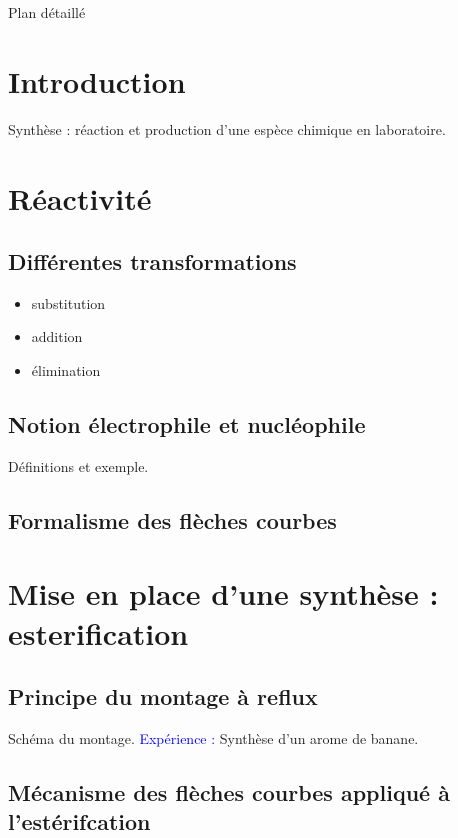 \begin{reportBlock}{Plan détaillé}
\section*{Introduction }
Synthèse : réaction et production d'une espèce chimique en laboratoire.

\section{Réactivité}
\subsection{Différentes transformations}
\begin{itemize}
    \item substitution
    \item addition
    \item élimination
\end{itemize}

\subsection{Notion électrophile et nucléophile}
Définitions et exemple.

\subsection{Formalisme des flèches courbes}

\section{Mise en place d'une synthèse : esterification}

\subsection{Principe du montage à reflux}
Schéma du montage.
\textcolor{blue}{Expérience :} Synthèse d'un arome de banane.

\subsection{Mécanisme des flèches courbes appliqué à l'estérifcation}

\end{reportBlock}